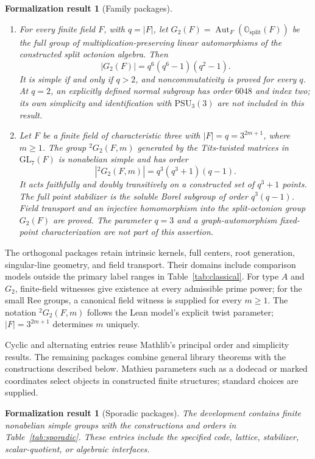 \documentclass[11pt]{article}
\numberwithin{equation}{section}
\newtheorem{formalization}[theorem]{Formalization result}
\theoremstyle{definition}
\newcommand{\GL}{\mathrm{GL}}
\newcommand{\PSU}{\mathrm{PSU}}
\newcommand{\Aut}{\operatorname{Aut}}
\begin{document}
\begin{formalization}[Family packages]
\begin{enumerate}[label=\textup{(\roman*)}]
\item For every finite field $F$, with $q=|F|$, let
$G_2(F)=\Aut_F(\mathbb O_{\mathrm{split}}(F))$ be the full group of
multiplication-preserving linear automorphisms of the constructed
split octonion algebra. Then
\begin{equation}\label{eq:g2order}
 |G_2(F)|=q^6(q^6-1)(q^2-1).
\end{equation}
It is simple if and only if $q>2$, and noncommutativity is proved
for every $q$. At $q=2$, an explicitly defined normal subgroup has
order $6048$ and index two; its own simplicity and identification
with $\PSU_3(3)$ are not included in this result.
\item Let $F$ be a finite field of characteristic three with
$|F|=q=3^{2m+1}$, where $m\geq1$. The group $ {}^2G_2(F,m)$ generated
by the Tits-twisted matrices in $\GL_7(F)$ is nonabelian
simple and has order
\begin{equation}\label{eq:reeorder}
 |{}^2G_2(F,m)|=q^3(q^3+1)(q-1).
\end{equation}
It acts faithfully and doubly transitively on a constructed set of
$q^3+1$ points. The full point stabilizer is the soluble Borel subgroup
of order $q^3(q-1)$. Field transport and an injective homomorphism into
the split-octonion group $G_2(F)$ are proved. The parameter $q=3$
and a graph-automorphism fixed-point characterization are not part of
this assertion.
\end{enumerate}
\end{formalization}

The orthogonal packages retain intrinsic kernels, full centers,
root generation, singular-line geometry, and field transport. Their
domains include comparison models outside the primary label ranges in
Table~\ref{tab:classical}. For type $A$ and $G_2$, finite-field witnesses
give existence at every admissible prime power; for the small Ree
groups, a canonical field witness is supplied for every $m\geq1$.
The notation $ {}^2G_2(F,m)$ follows the Lean model's explicit twist
parameter; $|F|=3^{2m+1}$ determines $m$ uniquely.

Cyclic and alternating entries reuse Mathlib's principal order and
simplicity results. The remaining packages combine general library
theorems with the constructions described below. Mathieu parameters
such as a dodecad or marked coordinates select objects in constructed
finite structures; standard choices are supplied.

\begin{formalization}[Sporadic packages]\label{thm:sporadics}
The development contains finite nonabelian simple groups with the
constructions and orders in Table~\ref{tab:sporadic}. These entries include
the specified code, lattice, stabilizer, scalar-quotient, or algebraic interfaces.
\end{formalization}
\end{document}
